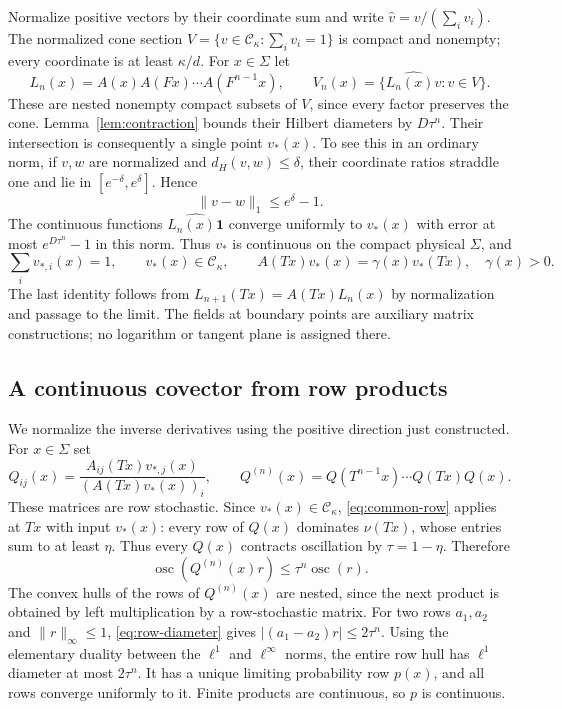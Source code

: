 \documentclass[11pt]{article}
\newcommand{\one}{\mathbf 1}
\newcommand{\osc}{\operatorname{osc}}
\begin{document}
Normalize positive vectors by their coordinate sum and write
$\widehat v=v/(\sum_i v_i)$. The normalized cone section
$V=\{v\in\mathcal C_\kappa:\sum_i v_i=1\}$ is compact and nonempty;
every coordinate is at least $\kappa/d$. For $x\in\Sigma$ let
\[
 L_n(x)=A(x)A(Fx)\cdots A(F^{n-1}x),\qquad
 V_n(x)=\{\widehat{L_n(x)v}:v\in V\}.
\]
These are nested nonempty compact subsets of $V$, since every factor preserves
the cone. Lemma~\ref{lem:contraction} bounds their Hilbert diameters by
$D\tau^n$. Their intersection is consequently a single point $v_*(x)$.
To see this in an ordinary norm, if $v,w$ are normalized and
$d_H(v,w)\leq\delta$, their coordinate ratios straddle one and lie in
$[e^{-\delta},e^\delta]$. Hence
\begin{equation}\label{eq:metric-conversion}
 \|v-w\|_1\leq e^\delta-1.
\end{equation}
The continuous functions $\widehat{L_n(x)\one}$ converge uniformly to
$v_*(x)$ with error at most $e^{D\tau^n}-1$ in this norm. Thus $v_*$
is continuous on the compact physical $\Sigma$, and
\begin{equation}\label{eq:covariance}
 \sum_i v_{*,i}(x)=1,\qquad
 v_*(x)\in\mathcal C_\kappa,\qquad
 A(Tx)v_*(x)=\gamma(x)v_*(Tx),\quad \gamma(x)>0.
\end{equation}
The last identity follows from $L_{n+1}(Tx)=A(Tx)L_n(x)$ by normalization
and passage to the limit. The fields at boundary points are auxiliary matrix
constructions; no logarithm or tangent plane is assigned there.

\subsection{A continuous covector from row products}

We normalize the inverse derivatives using the positive direction just
constructed. For $x\in\Sigma$ set
\begin{equation}\label{eq:Q}
 Q_{ij}(x)=
 \frac{A_{ij}(Tx)v_{*,j}(x)}{(A(Tx)v_*(x))_i},\qquad
 Q^{(n)}(x)=Q(T^{n-1}x)\cdots Q(Tx)Q(x).
\end{equation}
These matrices are row stochastic. Since $v_*(x)\in\mathcal C_\kappa$,
\eqref{eq:common-row} applies at $Tx$ with input $v_*(x)$: every row of
$Q(x)$ dominates $\nu(Tx)$, whose entries sum to at least $\eta$.
Thus every $Q(x)$ contracts oscillation by $\tau=1-\eta$. Therefore
\begin{equation}\label{eq:row-diameter}
 \osc(Q^{(n)}(x)r)\leq\tau^n\osc(r).
\end{equation}
The convex hulls of the rows of $Q^{(n)}(x)$ are nested, since the next
product is obtained by left multiplication by a row-stochastic matrix.
For two rows $a_1,a_2$ and $\|r\|_\infty\leq1$,
\eqref{eq:row-diameter} gives $|(a_1-a_2)r|\leq2\tau^n$.
Using the elementary duality between the $\ell^1$ and $\ell^\infty$ norms,
the entire row hull has $\ell^1$ diameter at most $2\tau^n$.
It has a unique limiting probability row $p(x)$, and all rows converge
uniformly to it. Finite products are continuous, so $p$ is continuous.
\end{document}
